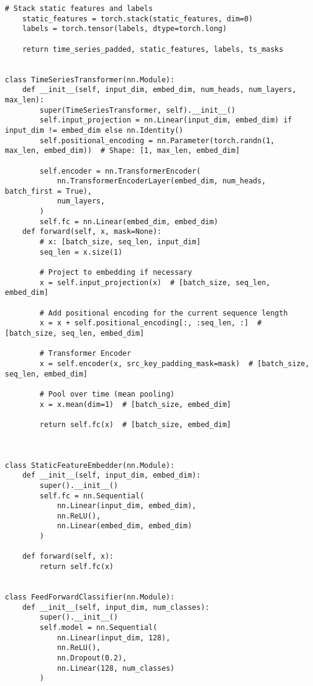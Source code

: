 \begin{appendices}
\begin{mdframed}
\begin{lstlisting}[breaklines=true]
    # Stack static features and labels
    static_features = torch.stack(static_features, dim=0)
    labels = torch.tensor(labels, dtype=torch.long)

    return time_series_padded, static_features, labels, ts_masks


class TimeSeriesTransformer(nn.Module):
    def __init__(self, input_dim, embed_dim, num_heads, num_layers, max_len):
        super(TimeSeriesTransformer, self).__init__()
        self.input_projection = nn.Linear(input_dim, embed_dim) if input_dim != embed_dim else nn.Identity()
        self.positional_encoding = nn.Parameter(torch.randn(1, max_len, embed_dim))  # Shape: [1, max_len, embed_dim]
        
        self.encoder = nn.TransformerEncoder(
            nn.TransformerEncoderLayer(embed_dim, num_heads, batch_first = True),
            num_layers,
        )
        self.fc = nn.Linear(embed_dim, embed_dim)
    def forward(self, x, mask=None):
        # x: [batch_size, seq_len, input_dim]
        seq_len = x.size(1)
    
        # Project to embedding if necessary
        x = self.input_projection(x)  # [batch_size, seq_len, embed_dim]
    
        # Add positional encoding for the current sequence length
        x = x + self.positional_encoding[:, :seq_len, :]  # [batch_size, seq_len, embed_dim]
    
        # Transformer Encoder
        x = self.encoder(x, src_key_padding_mask=mask)  # [batch_size, seq_len, embed_dim]
    
        # Pool over time (mean pooling)
        x = x.mean(dim=1)  # [batch_size, embed_dim]
    
        return self.fc(x)  # [batch_size, embed_dim]



class StaticFeatureEmbedder(nn.Module):
    def __init__(self, input_dim, embed_dim):
        super().__init__()
        self.fc = nn.Sequential(
            nn.Linear(input_dim, embed_dim),
            nn.ReLU(),
            nn.Linear(embed_dim, embed_dim)
        )

    def forward(self, x):
        return self.fc(x)


class FeedForwardClassifier(nn.Module):
    def __init__(self, input_dim, num_classes):
        super().__init__()
        self.model = nn.Sequential(
            nn.Linear(input_dim, 128),
            nn.ReLU(),
            nn.Dropout(0.2),
            nn.Linear(128, num_classes)
        )


\end{lstlisting}
\end{mdframed}
\end{appendices}
